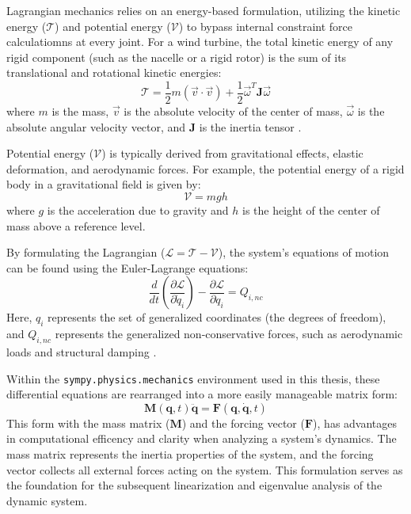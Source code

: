 \documentclass[final,onecolumn]{IEEEtran}
\begin{document}
Lagrangian mechanics relies on an energy-based formulation, utilizing the kinetic energy ($\mathcal{T}$) and potential energy ($\mathcal{V}$) to bypass internal constraint force calculatiomns at every joint. For a wind turbine, the total kinetic energy of any rigid component (such as the nacelle or a rigid rotor) is the sum of its translational and rotational kinetic energies:
\begin{equation}
    \mathcal{T} = \frac{1}{2}m(\vec{v} \cdot \vec{v}) + \frac{1}{2}\vec{\omega}^T \mathbf{J} \vec{\omega}
\end{equation}
where $m$ is the mass, $\vec{v}$ is the absolute velocity of the center of mass, $\vec{\omega}$ is the absolute angular velocity vector, and $\mathbf{J}$ is the inertia tensor \cite{Branlard2025notes}.

Potential energy ($\mathcal{V}$) is typically derived from gravitational effects, elastic deformation, and aerodynamic forces. For example, the potential energy of a rigid body in a gravitational field is given by:
\begin{equation}
    \mathcal{V} = mgh
\end{equation}
where $g$ is the acceleration due to gravity and $h$ is the height of the center of mass above a reference level.

By formulating the Lagrangian ($\mathcal{L} = \mathcal{T} - \mathcal{V}$), the system's equations of motion can be found using the Euler-Lagrange equations:
\begin{equation}
    \label{eq:lagrange}
    \frac{d}{dt}\left(\frac{\partial\mathcal{L}}{\partial\dot{q}_i}\right)-\frac{\partial\mathcal{L}}{\partial q_i}=Q_{i,nc}
\end{equation}
Here, $q_i$ represents the set of generalized coordinates (the degrees of freedom), and $Q_{i,nc}$ represents the generalized non-conservative forces, such as aerodynamic loads and structural damping \cite{Branlard2025notes}.

Within the \texttt{sympy.physics.mechanics} environment used in this thesis, these differential equations are rearranged into a more easily manageable matrix form:
\begin{equation}
    \mathbf{M}(\mathbf{q}, t) \ddot{\mathbf{q}} = \mathbf{F}(\mathbf{q}, \dot{\mathbf{q}}, t)
\end{equation}
This form with the mass matrix ($\mathbf{M}$) and the forcing vector ($\mathbf{F}$), has advantages in computational efficency and clarity when analyzing a system's dynamics. The mass matrix represents the inertia properties of the system, and the forcing vector collects all external forces acting on the system. This formulation serves as the foundation for the subsequent linearization and eigenvalue analysis of the dynamic system.
\end{document}
